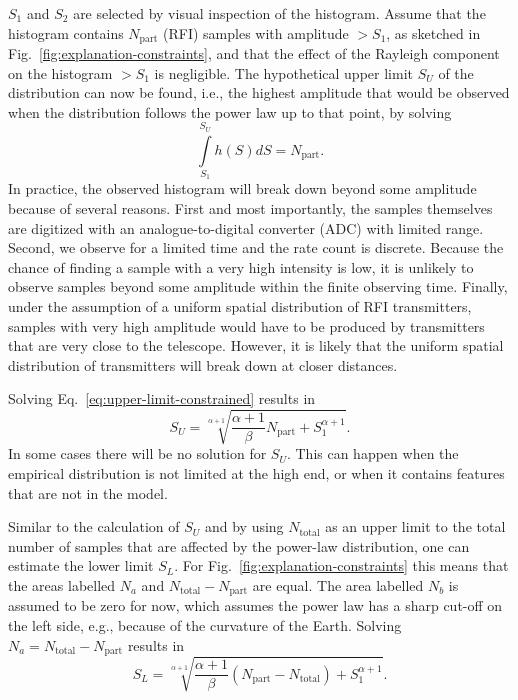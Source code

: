 \documentclass[useAMS,usenatbib]{mn2e}
\begin{document}
$S_1$ and $S_2$ are selected by visual inspection of the histogram. Assume that the histogram contains $N_\textrm{part}$ (RFI) samples with amplitude $> S_1$, as sketched in Fig.~\ref{fig:explanation-constraints}, and that the effect of the Rayleigh component on the histogram $> S_1$ is negligible. The hypothetical upper limit $S_U$ of the distribution can now be found, i.e., the highest amplitude that would be observed when the distribution follows the power law up to that point, by solving
\begin{equation} \label{eq:upper-limit-constrained}
 \int\limits_{S_1}^{S_U} h(S) dS = N_\textrm{part}.
\end{equation}
In practice, the observed histogram will break down beyond some amplitude because of several reasons. First and most importantly, the samples themselves are digitized with an analogue-to-digital converter (ADC) with limited range. Second, we observe for a limited time and the rate count is discrete. Because the chance of finding a sample with a very high intensity is low, it is unlikely to observe samples beyond some amplitude within the finite observing time. Finally, under the assumption of a uniform spatial distribution of RFI transmitters, samples with very high amplitude would have to be produced by transmitters that are very close to the telescope. However, it is likely that the uniform spatial distribution of transmitters will break down at closer distances.

Solving Eq.~\eqref{eq:upper-limit-constrained} results in
\begin{equation} \label{eq:upper-limit}
S_U = \sqrt[\alpha+1]{\frac{\alpha+1}{\beta} N_\textrm{part} + S_1^{\alpha+1}}.
\end{equation}
In some cases there will be no solution for $S_U$. This can happen when the empirical distribution is not limited at the high end, or when it contains features that are not in the model.

Similar to the calculation of $S_U$ and by using $N_\textrm{total}$ as an upper limit to the total number of samples that are affected by the power-law distribution, one can estimate the lower limit $S_L$. For Fig.~\ref{fig:explanation-constraints} this means that the areas labelled $N_a$ and $N_\textrm{total}-N_\textrm{part}$ are equal. The area labelled $N_b$ is assumed to be zero for now, which assumes the power law has a sharp cut-off on the left side, e.g., because of the curvature of the Earth. Solving $N_a = N_\textrm{total}-N_\textrm{part}$ results in
\begin{equation} \label{eq:lower-limit-1}
S_L = \sqrt[\alpha+1]{\frac{\alpha+1}{\beta}\left(N_\textrm{part} - N_\textrm{total} \right) + S_1^{\alpha+1}}.
\end{equation}
\end{document}
